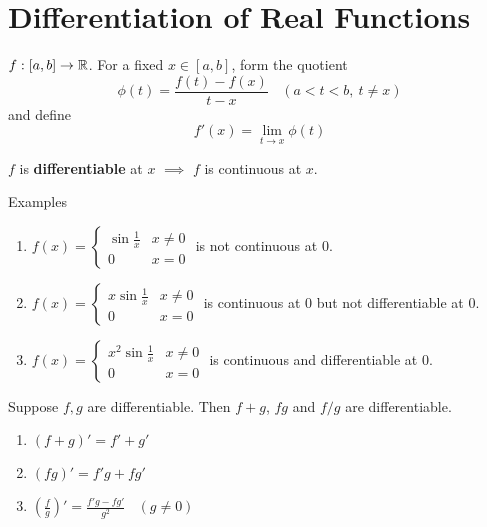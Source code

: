 \section{Differentiation of Real Functions}
    
    \begin{defi}
        $f: [a,b] \to \mathbb{R}$. For a fixed $x \in [a,b]$, form the quotient
        \begin{equation}
            \phi(t) = \frac{f(t)-f(x)}{t-x} \ \ \ \ (a<t<b, \ t \neq x)
        \end{equation}
        and define 
        \begin{equation}
            f'(x) = \lim_{t \to x} \phi(t)
        \end{equation}
    \end{defi}

    \begin{theo}
        $f$ is \textbf{differentiable} at $x$ $\implies$ $f$ is continuous at $x$.
    \end{theo}

    Examples
    \begin{enumerate}
        \item $f(x) = 
            \begin{cases}
                \sin \frac{1}{x} & x \neq 0 \\
                0 & x = 0
            \end{cases}
        $ is not continuous at $0$.
        \item $f(x) = 
            \begin{cases}
                x\sin \frac{1}{x} & x \neq 0 \\
                0 & x = 0
            \end{cases}
        $ is continuous at $0$ but not differentiable at $0$.
        \item $f(x) = 
            \begin{cases}
                x^2 \sin \frac{1}{x} & x \neq 0 \\
                0 & x = 0
            \end{cases}
        $ is continuous and differentiable at $0$.
    \end{enumerate}
    

    \begin{theo}
        Suppose $f,g$ are differentiable. Then $f+g$, $fg$ and $f/g$ are differentiable.
        \begin{enumerate}
            \item $(f+g)' = f'+g'$
            \item $(fg)' = f'g+fg'$
            \item $(\frac{f}{g})' = \frac{f'g-fg'}{g^2} \ \ \ \ (g \neq 0)$
        \end{enumerate}
    \end{theo}

